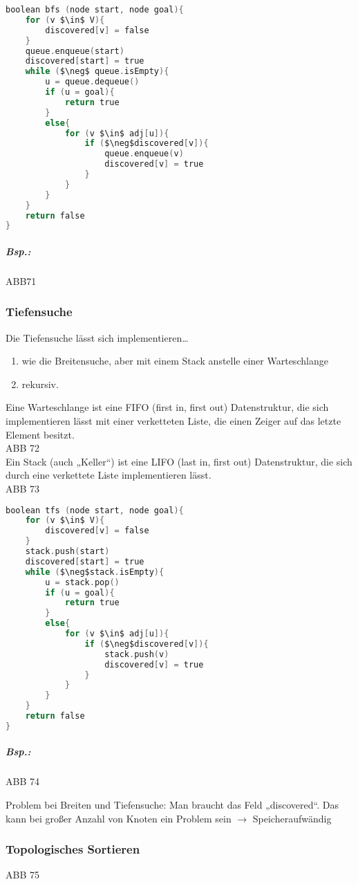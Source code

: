 \begin{lstlisting}[language=C]
boolean bfs (node start, node goal){
	for (v $\in$ V){
		discovered[v] = false
	}
	queue.enqueue(start)
	discovered[start] = true
	while ($\neg$ queue.isEmpty){
		u = queue.dequeue()
		if (u = goal){
			return true
		}
		else{
			for (v $\in$ adj[u]){
				if ($\neg$discovered[v]){
					queue.enqueue(v)
					discovered[v] = true
				}
			}
		}
	}
	return false
}
\end{lstlisting}
\subparagraph{Bsp.:} \parskp
ABB71

\subsubsection{Tiefensuche}
Die Tiefensuche lässt sich implementieren…
\begin{enumerate}
\item wie die Breitensuche, aber mit einem Stack anstelle einer Warteschlange
\item rekursiv.
\end{enumerate}
Eine Warteschlange ist eine FIFO (first in, first out) Datenstruktur, die sich implementieren lässt mit einer verketteten Liste, die einen Zeiger auf das letzte Element besitzt.\\
ABB 72\\
Ein Stack (auch „Keller“) ist eine LIFO (last in, first out) Datenstruktur, die sich durch eine verkettete Liste implementieren lässt.\\
ABB 73

\begin{lstlisting}[language=C]
boolean tfs (node start, node goal){
	for (v $\in$ V){
		discovered[v] = false
	}
	stack.push(start)
	discovered[start] = true
	while ($\neg$stack.isEmpty){
		u = stack.pop()
		if (u = goal){
			return true
		}
		else{
			for (v $\in$ adj[u]){
				if ($\neg$discovered[v]){
					stack.push(v)
					discovered[v] = true
				}
			}
		}
	}
	return false
}
\end{lstlisting}

\subparagraph{Bsp.:} \parskp
ABB 74 \bigskip

Problem bei Breiten und Tiefensuche: Man braucht das Feld „discovered“. Das kann bei großer Anzahl von Knoten ein Problem sein $\rightarrow$ Speicheraufwändig

\subsubsection{Topologisches Sortieren} \parskp
ABB 75
